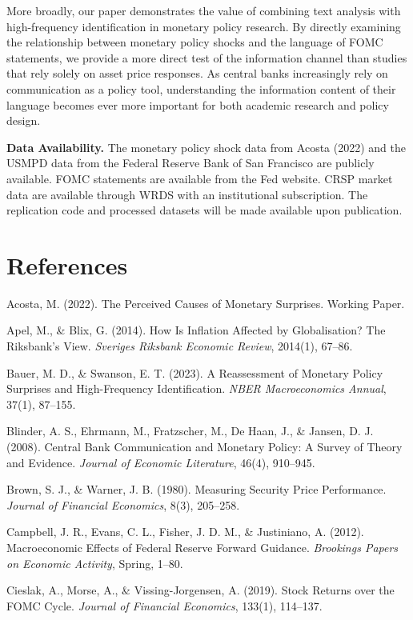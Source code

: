 \documentclass[12pt]{article}
\begin{document}
More broadly, our paper demonstrates the value of combining text analysis with high-frequency identification in monetary policy research. By directly examining the relationship between monetary policy shocks and the language of FOMC statements, we provide a more direct test of the information channel than studies that rely solely on asset price responses. As central banks increasingly rely on communication as a policy tool, understanding the information content of their language becomes ever more important for both academic research and policy design.

\textbf{Data Availability.} The monetary policy shock data from Acosta (2022) and the USMPD data from the Federal Reserve Bank of San Francisco are publicly available. FOMC statements are available from the Fed website. CRSP market data are available through WRDS with an institutional subscription. The replication code and processed datasets will be made available upon publication.



\section{References}

Acosta, M. (2022). The Perceived Causes of Monetary Surprises. Working Paper.

Apel, M., \& Blix, G. (2014). How Is Inflation Affected by Globalisation? The Riksbank's View. \textit{Sveriges Riksbank Economic Review}, 2014(1), 67--86.

Bauer, M. D., \& Swanson, E. T. (2023). A Reassessment of Monetary Policy Surprises and High-Frequency Identification. \textit{NBER Macroeconomics Annual}, 37(1), 87--155.

Blinder, A. S., Ehrmann, M., Fratzscher, M., De Haan, J., \& Jansen, D. J. (2008). Central Bank Communication and Monetary Policy: A Survey of Theory and Evidence. \textit{Journal of Economic Literature}, 46(4), 910--945.

Brown, S. J., \& Warner, J. B. (1980). Measuring Security Price Performance. \textit{Journal of Financial Economics}, 8(3), 205--258.

Campbell, J. R., Evans, C. L., Fisher, J. D. M., \& Justiniano, A. (2012). Macroeconomic Effects of Federal Reserve Forward Guidance. \textit{Brookings Papers on Economic Activity}, Spring, 1--80.

Cieslak, A., Morse, A., \& Vissing-Jorgensen, A. (2019). Stock Returns over the FOMC Cycle. \textit{Journal of Financial Economics}, 133(1), 114--137.
\end{document}
